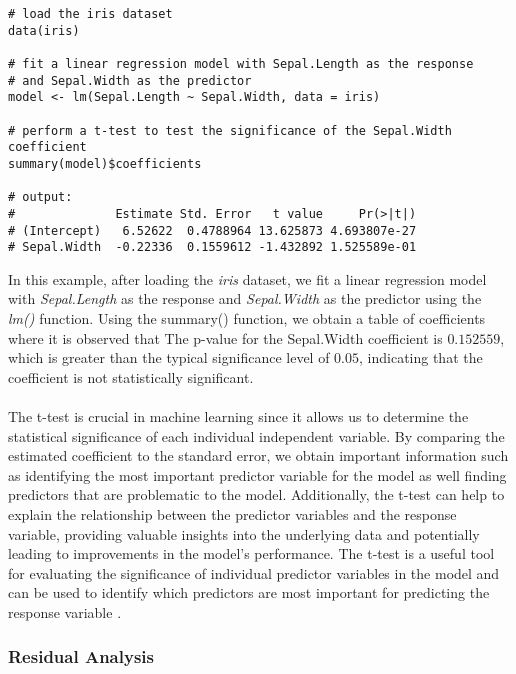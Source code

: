 \documentclass{article}[12pt]
\newcounter{example}[section]
\theoremstyle{definition}
\begin{document}
\medskip

\begin{verbatim}
# load the iris dataset
data(iris)

# fit a linear regression model with Sepal.Length as the response 
# and Sepal.Width as the predictor
model <- lm(Sepal.Length ~ Sepal.Width, data = iris)

# perform a t-test to test the significance of the Sepal.Width coefficient
summary(model)$coefficients

# output:
#              Estimate Std. Error   t value     Pr(>|t|)
# (Intercept)   6.52622  0.4788964 13.625873 4.693807e-27
# Sepal.Width  -0.22336  0.1559612 -1.432892 1.525589e-01
\end{verbatim}

\bigskip

\noindent
In this example, after loading the \emph{iris} dataset, we fit a linear regression model with \emph{Sepal.Length} as the response and \emph{Sepal.Width} as the predictor using the \emph{lm()} function. Using the summary() function, we obtain a table of coefficients where it is observed that The p-value for the Sepal.Width coefficient is $0.152559$, which is greater than the typical significance level of $0.05$, indicating that the coefficient is not statistically significant.
\\
\\
The t-test is crucial in machine learning since it allows us to determine the statistical significance of each individual independent variable. By comparing the estimated coefficient to the standard error, we obtain important information such as identifying the most important predictor variable for the model as well finding predictors that are problematic to the model. Additionally, the t-test can help to explain the relationship between the predictor variables and the response variable, providing valuable insights into the underlying data and potentially leading to improvements in the model's performance. The t-test is a useful tool for evaluating the significance of individual predictor variables in the model and can be used to identify which predictors are most important for predicting the response variable \cite{zuur_ieno_g._2009}.

\newpage

\bigskip

\subsubsection{Residual Analysis}
\end{document}
